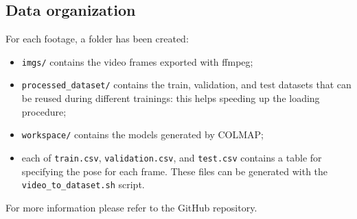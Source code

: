 \subsection{Data organization}
For each footage, a folder has been created:
\begin{itemize}
    \item \texttt{imgs/} contains the video frames exported with ffmpeg;
    \item \texttt{processed\_dataset/} contains the train, validation, and test datasets that can be reused during different trainings: this helps speeding up the loading procedure;
    \item \texttt{workspace/} contains the models generated by COLMAP;
    \item each of \texttt{train.csv}, \texttt{validation.csv}, and \texttt{test.csv} contains a table for specifying the pose for each frame. These files can be generated with the \texttt{video\_to\_dataset.sh} script.
\end{itemize}

For more information please refer to the GitHub repository.
